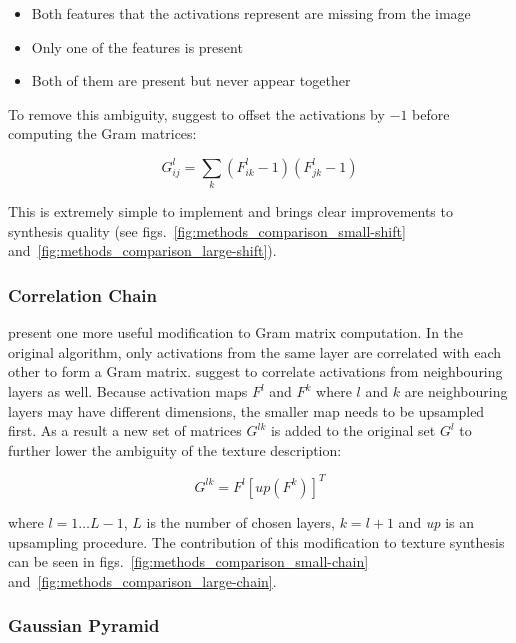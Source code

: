 \begin{itemize}
    \item Both features that the activations represent are missing from the image
    \item Only one of the features is present
    \item Both of them are present but never appear together
\end{itemize}

To remove this ambiguity, \citet{Novak2016} suggest to offset the activations by \(-1\) before computing the Gram matrices:

\begin{equation}
    \label{eq:gram_style_activation_shift}
    G_{ij}^l = \sum_k (F_{ik}^l - 1) (F_{jk}^l - 1)
\end{equation}

This is extremely simple to implement and brings clear improvements to synthesis quality (see figs.~\ref{fig:methods_comparison_small-shift} and~\ref{fig:methods_comparison_large-shift}).

\subsubsection{Correlation Chain}
\label{section:methods-texture_model-improvements-correlation_chain}

\citet{Novak2016} present one more useful modification to Gram matrix computation. In the original algorithm, only activations from the same layer are correlated with each other to form a Gram matrix. \citet{Novak2016} suggest to correlate activations from neighbouring layers as well. Because activation maps \(F^l\) and \(F^k\) where \(l\) and \(k\) are neighbouring layers may have different dimensions, the smaller map needs to be upsampled first. As a result a new set of matrices \(G^{lk}\) is added to the original set \(G^l\) to further lower the ambiguity of the texture description:

\begin{equation}
    \label{eq:gram_style_chain}
    G^{lk} = F^l [\textit{up}(F^k)]^T
\end{equation}

where \(l = 1 \dots L - 1\), \(L\) is the number of chosen layers, \(k = l + 1\) and \textit{up} is an upsampling procedure. The contribution of this modification to texture synthesis can be seen in figs.~\ref{fig:methods_comparison_small-chain} and~\ref{fig:methods_comparison_large-chain}.

\subsubsection{Gaussian Pyramid}
\label{section:methods-texture_model-improvements-gaussian_pyramid}

